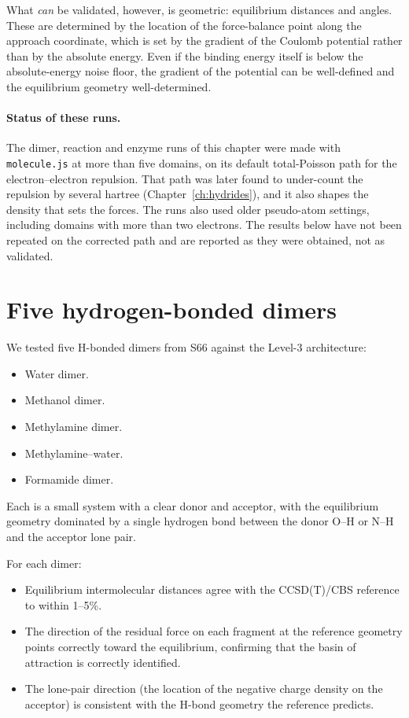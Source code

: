 What \emph{can} be validated, however, is geometric: equilibrium distances and angles. These are determined by the location of the force-balance point along the approach coordinate, which is set by the gradient of the Coulomb potential rather than by the absolute energy. Even if the binding energy itself is below the absolute-energy noise floor, the gradient of the potential can be well-defined and the equilibrium geometry well-determined.

\paragraph{Status of these runs.} The dimer, reaction and enzyme runs of this chapter were made with
\texttt{molecule.js} at more than five domains, on its default total-Poisson path for the
electron--electron repulsion. That path was later found to under-count the repulsion by several hartree
(Chapter~\ref{ch:hydrides}), and it also shapes the density that sets the forces. The runs also used
older pseudo-atom settings, including domains with more than two electrons. The results below have not
been repeated on the corrected path and are reported as they were obtained, not as validated.

\section{Five hydrogen-bonded dimers}\label{sec:five-dimers}

We tested five H-bonded dimers from S66 against the Level-3 architecture:
\begin{itemize}
\item Water dimer.
\item Methanol dimer.
\item Methylamine dimer.
\item Methylamine--water.
\item Formamide dimer.
\end{itemize}
Each is a small system with a clear donor and acceptor, with the equilibrium geometry dominated by a single hydrogen bond between the donor O--H or N--H and the acceptor lone pair.

For each dimer:
\begin{itemize}
\item Equilibrium intermolecular distances agree with the CCSD(T)/CBS reference to within 1--5\%.
\item The direction of the residual force on each fragment at the reference geometry points correctly toward the equilibrium, confirming that the basin of attraction is correctly identified.
\item The lone-pair direction (the location of the negative charge density on the acceptor) is consistent with the H-bond geometry the reference predicts.
\end{itemize}

